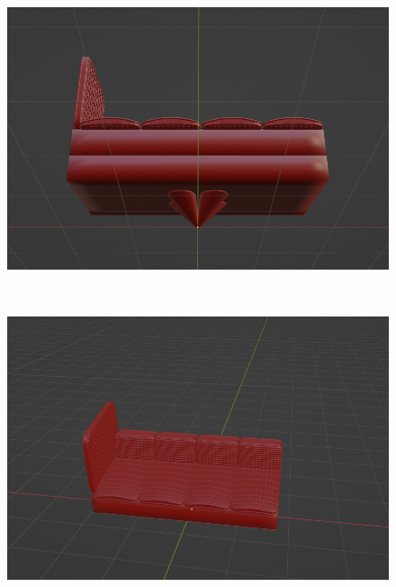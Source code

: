 \begin{figure}[h]
\begin{minipage}[b]{0.48\linewidth}
 \end{minipage}
 \begin{minipage}[b]{0.48\linewidth}
  \centering
  \includegraphics[scale=0.17]{./imgs/sofaParamMean/legPosMax.png}
 \end{minipage}\\
 \begin{minipage}[b]{0.48\linewidth}
  \centering
  \includegraphics[scale=0.17]{./imgs/sofaParamMean/1BaseMin.png}
 \end{minipage}
 \begin{minipage}[b]{0.48\linewidth}
  \centering

\end{minipage}
\end{figure}
